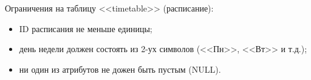 Ограничения на таблицу <<timetable>> (расписание):

\begin{itemize}
  \item ID расписания не меньше единицы;
  \item день недели должен состоять из 2-ух символов (<<Пн>>, <<Вт>> и т.д.);
  \item ни один из атрибутов не дожен быть пустым (NULL).
\end{itemize}

